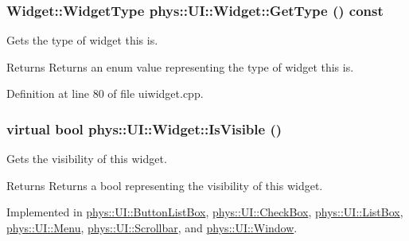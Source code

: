 \hypertarget{classphys_1_1UI_1_1Widget_a76337b279bd372ce225f94ab1da191ea}{
\subsubsection[{GetType}]{\setlength{\rightskip}{0pt plus 5cm}Widget::WidgetType phys::UI::Widget::GetType () const}}
\label{d9/d48/classphys_1_1UI_1_1Widget_a76337b279bd372ce225f94ab1da191ea}


Gets the type of widget this is. 

\begin{DoxyReturn}{Returns}
Returns an enum value representing the type of widget this is. 
\end{DoxyReturn}


Definition at line 80 of file uiwidget.cpp.

\hypertarget{classphys_1_1UI_1_1Widget_aaf1a1bd31b8e626467ce9cdb69bdf7ac}{
\subsubsection[{IsVisible}]{\setlength{\rightskip}{0pt plus 5cm}virtual bool phys::UI::Widget::IsVisible ()}}
\label{d9/d48/classphys_1_1UI_1_1Widget_aaf1a1bd31b8e626467ce9cdb69bdf7ac}


Gets the visibility of this widget. 

\begin{DoxyReturn}{Returns}
Returns a bool representing the visibility of this widget. 
\end{DoxyReturn}


Implemented in \hyperlink{classphys_1_1UI_1_1ButtonListBox_a1282a1494079e47b48c8e3296b1a8bb0}{phys::UI::ButtonListBox}, \hyperlink{classphys_1_1UI_1_1CheckBox_a8a2be0cba227f0921071fb14de24f76d}{phys::UI::CheckBox}, \hyperlink{classphys_1_1UI_1_1ListBox_a638f19eb6e5a0bd3291fab1ebaccc84f}{phys::UI::ListBox}, \hyperlink{classphys_1_1UI_1_1Menu_ae23321617d7e14448e2fab3b455c3dc7}{phys::UI::Menu}, \hyperlink{classphys_1_1UI_1_1Scrollbar_a213c946ccadd3b689f59e2761a1d1848}{phys::UI::Scrollbar}, and \hyperlink{classphys_1_1UI_1_1Window_aa1d88c50c0965510b494b51f3e5a7bf0}{phys::UI::Window}.

